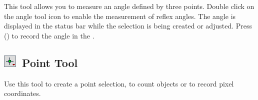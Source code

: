 
This tool allows you to measure an angle defined by three points.
Double click on the angle tool icon to enable the measurement of reflex
angles. The angle is displayed in the status bar while the selection
is being created or adjusted. Press  (\textsf{})
to record the angle in the  .




\subsection[Point Tool]{\noindent \textsf{\protect\includegraphics[bb=0bp 5bp 20bp 20bp,scale=0.6]{images/tools/Point}}~Point
Tool\label{sec:Point-Tool}\improvement{}}

Use this tool to create a point selection, to count objects or to
record pixel coordinates.

